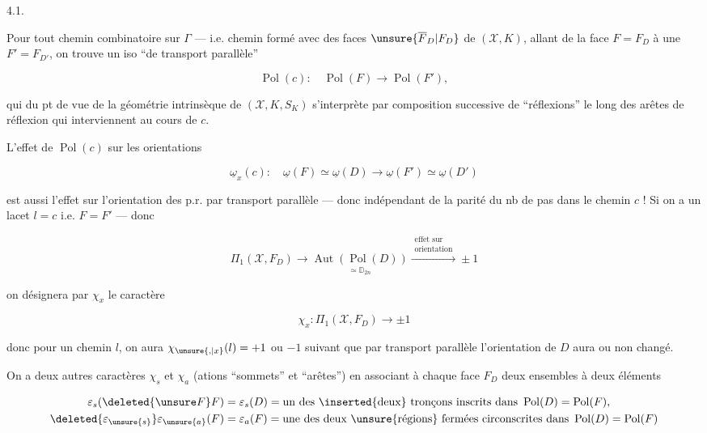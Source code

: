 

4.1.

Pour tout  chemin  combinatoire sur $\Gamma$ --- i.e. chemin formé avec des faces $\unsure{\overline F_D|F_D}$ de $(\mathcal X,K)$,  allant de la face $F=F_D$ à une $F'=F_{D'}$, on trouve un iso ``de transport parallèle''

\[ \operatorname{Pol}(c):\quad \operatorname{Pol}(F)\longrightarrow\operatorname{Pol}(F'), \]

qui du pt de vue de la géométrie intrinsèque de $(\mathcal X,K,S_K)$ s'interprète par composition successive de ``réflexions'' le long des arêtes de réflexion qui interviennent au cours de $c$.

L'effet de $\operatorname{Pol}(c)$ sur les orientations

\[ \underline{\omega}_x(c):\quad \underline{\omega}(F)\simeq\underline{\omega}(D)\longrightarrow\underline{\omega}(F')\simeq\underline{\omega}(D') \]

est aussi l'effet sur l'orientation des p.r. par transport parallèle --- donc  indépendant de la parité du nb de pas dans le chemin $c$ ! Si on a un lacet \deleted{\unsure{\ell}} $l=c$ i.e. $F=F'$ --- donc

\[ \Pi_1(\mathcal X,F_D)\longrightarrow\underset{\simeq\mathbb D_{2n}}{\operatorname{Aut}(\operatorname{Pol}(D))}\xrightarrow{\substack{\text{effet sur}\\\text{orientation}}}\pm1 \]

on désignera par $\chi_x$ le caractère 

\[ \chi_x:\Pi_1(\mathcal X,F_D)\longrightarrow\pm1 \]

donc pour un chemin $l$, on aura $\chi_{\unsure{,|x}}(l)=+1$ ou $-1$ suivant que par transport parallèle l'orientation de $D$ aura ou non changé. 

On a deux autres caractères $\chi_s$ et $\chi_a$ (ations ``sommets'' et ``arêtes'') en associant à chaque face $F_D$  deux ensembles à deux éléments

\[ \begin{aligned}
\varepsilon_s(\deleted{\unsure F}F)&=\varepsilon_s(D)=\text{un des \inserted{deux} tronçons inscrits dans }\operatorname{Pol}(D)=\operatorname{Pol}(F),\\
\deleted{\varepsilon_{\unsure{s}}}\varepsilon_{\unsure{a}}(F)&=\varepsilon_a(F)=\text{une des deux \unsure{régions} fermées circonscrites dans }\operatorname{Pol}(D)=\operatorname{Pol}(F)
\end{aligned} \]
